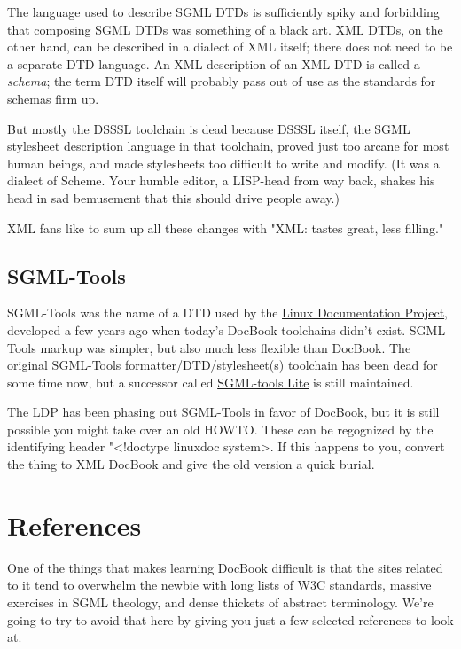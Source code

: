 \documentclass[pdftex,english,a4paper,10pt]{infocom}
\begin{document}
The language used to describe SGML DTDs is sufficiently spiky
and forbidding that composing SGML DTDs was something of a black art.
XML DTDs, on the other hand, can be described in a dialect of XML
itself; there does not need to be a separate DTD language. An XML
description of an XML DTD is called a
{\em schema};
the term DTD itself will probably pass out of use as the standards for
schemas firm up.

But mostly the DSSSL toolchain is dead because DSSSL itself, the
SGML stylesheet description language in that toolchain, proved just too
arcane for most human beings, and made stylesheets too difficult to
write and modify. (It was a dialect of Scheme.  Your humble editor, a
LISP-head from way back, shakes his head in sad bemusement that
this should drive people away.)

XML fans like to sum up all these changes with "XML: tastes great, less
filling."
\subsection{SGML-Tools}
\label{id177956}\hypertarget{id177956}{}%

SGML-Tools was the name of a DTD used by the \href{http://www.linuxdoc.org}{Linux Documentation Project},
developed a few years ago when today's DocBook toolchains didn't exist.
SGML-Tools markup was simpler, but also much less flexible than
DocBook.  The original SGML-Tools formatter/DTD/stylesheet(s)
toolchain has been dead for some time now, but a successor called \href{http://sourceforge.net/projects/sgmltools-lite/}{SGML-tools
Lite} is still maintained.

The LDP has been phasing out SGML-Tools in favor of DocBook, but
it is still possible you might take over an old HOWTO.  These can be
regognized by the identifying header "\textless{}!doctype linuxdoc
system\textgreater{}. If this happens to you, convert the thing to XML DocBook
and give the old version a quick burial.

\section{References}
\label{id177984}\hypertarget{id177984}{}%

One of the things that makes learning DocBook difficult is that
the sites related to it tend to overwhelm the newbie with long lists
of W3C standards, massive exercises in SGML theology, and dense
thickets of abstract terminology.  We're going to try to avoid that
here by giving you just a few selected references to look at.
\end{document}
